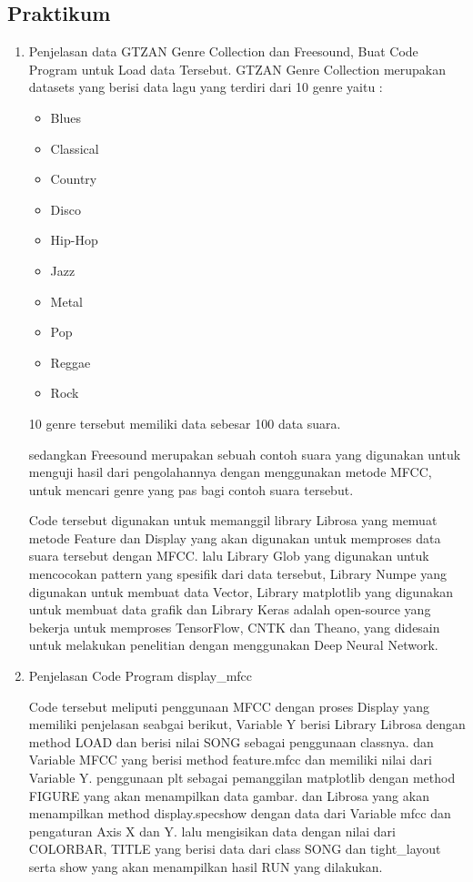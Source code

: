\subsection{Praktikum}
\begin{enumerate}
\item Penjelasan data GTZAN Genre Collection dan Freesound, Buat Code Program untuk Load data Tersebut.
\subitem GTZAN Genre Collection merupakan datasets yang berisi data lagu yang terdiri dari 10 genre yaitu :
\begin{itemize}
\item Blues
\item Classical
\item Country
\item Disco
\item Hip-Hop
\item Jazz
\item Metal
\item Pop
\item Reggae
\item Rock
\end{itemize}
10 genre tersebut memiliki data sebesar 100 data suara.

\subitem sedangkan Freesound merupakan sebuah contoh suara yang digunakan untuk menguji hasil dari pengolahannya dengan menggunakan metode MFCC, untuk mencari genre yang pas bagi contoh suara tersebut.



\subitem Code tersebut digunakan untuk memanggil library Librosa yang memuat metode Feature dan Display yang akan digunakan untuk memproses data suara tersebut dengan MFCC. lalu Library Glob yang digunakan untuk mencocokan pattern yang spesifik dari data tersebut, Library Numpe yang digunakan untuk membuat data Vector, Library matplotlib yang digunakan untuk membuat data grafik dan Library Keras adalah open-source yang bekerja untuk memproses TensorFlow, CNTK dan Theano, yang didesain untuk melakukan penelitian dengan menggunakan Deep Neural Network.

\item Penjelasan Code Program display\_mfcc



\subitem Code tersebut meliputi penggunaan MFCC dengan proses Display yang memiliki penjelasan seabgai berikut, Variable Y berisi Library Librosa dengan method LOAD dan berisi nilai SONG sebagai penggunaan classnya. dan Variable MFCC yang berisi method feature.mfcc dan memiliki nilai dari Variable Y. penggunaan plt sebagai pemanggilan matplotlib dengan method FIGURE yang akan menampilkan data gambar. dan Librosa yang akan menampilkan method display.specshow dengan data dari Variable mfcc dan pengaturan Axis X dan Y. lalu mengisikan data dengan nilai dari COLORBAR, TITLE yang berisi data dari class SONG dan tight\_layout serta show yang akan menampilkan hasil RUN yang dilakukan.


\end{enumerate}
